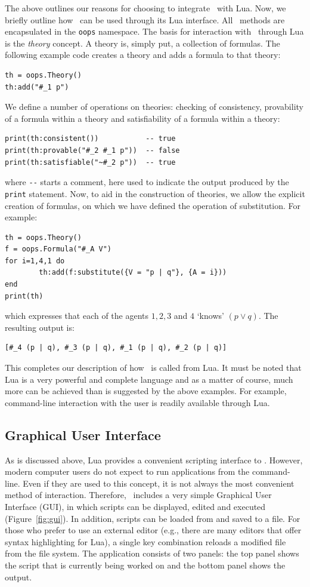 The above outlines our reasons for choosing to integrate \oops\ with Lua. Now,
we briefly outline how \oops\ can be used through its Lua interface.
All \oops\ methods are encapsulated in the \lstinline!oops! namespace.
The basis for interaction with \oops\ through Lua is the {\em theory} concept.
A theory is, simply put, a collection of formulas. The following example code
creates a theory and adds a formula to that theory:
\begin{lstlisting}
th = oops.Theory()
th:add("#_1 p")
\end{lstlisting}
We define a number of operations on theories: checking of consistency,
provability of a formula within a theory and satisfiability of a formula
within a theory:
\begin{lstlisting}
print(th:consistent())           -- true
print(th:provable("#_2 #_1 p"))  -- false
print(th:satisfiable("~#_2 p"))  -- true
\end{lstlisting}
where \lstinline!--! starts a comment, here used to indicate the output
produced by the \lstinline!print! statement. 
Now, to aid in the construction of theories, we allow the explicit creation of
formulas, on which we have defined the operation of substitution. For example:
\begin{lstlisting}
th = oops.Theory()
f = oops.Formula("#_A V")
for i=1,4,1 do
        th:add(f:substitute({V = "p | q"}, {A = i}))
end
print(th)
\end{lstlisting}
which expresses that each of the agents $1, 2, 3$ and $4$ `knows' $(p \vee
q)$. The resulting output is:
\begin{lstlisting}
[#_4 (p | q), #_3 (p | q), #_1 (p | q), #_2 (p | q)]
\end{lstlisting}

This completes our description of how \oops\ is called from Lua. It must be
noted that Lua is a very powerful and complete language and as a matter of
course, much more can be achieved than is suggested by the above examples. For
example, command-line interaction with the user is readily available through
Lua.

\subsection{Graphical User Interface}

As is discussed above, Lua provides a convenient scripting interface to \oops.
However, modern computer users do not expect to run applications from the
command-line. Even if they are used to this concept, it is not always the most
convenient method of interaction. Therefore,
\oops\ includes a very simple Graphical User Interface (GUI), in which scripts
can be displayed, edited and executed (Figure~\ref{fig:gui}). In addition,
scripts can be loaded from and saved to a file. For those who prefer to use an
external editor (e.g., there are many editors that offer syntax highlighting
for Lua), a single key combination reloads a modified file from the
file system. The application consists of two panels: the top panel shows the
script that is currently being worked on and the bottom panel shows the
output.


